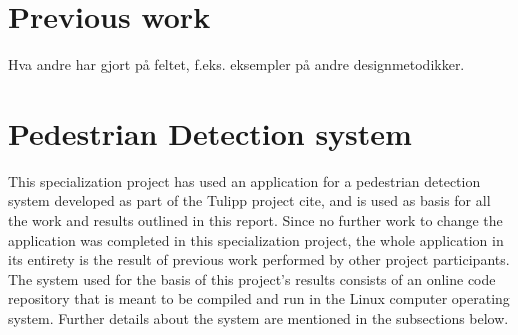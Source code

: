 \section{Previous work}
Hva andre har gjort på feltet, f.eks. eksempler på andre designmetodikker. 

\section{Pedestrian Detection system}
This specialization project has used an application for a pedestrian detection system developed as part of the Tulipp project cite, and is used as basis for all the work and results outlined in this report. Since no further work to change the application was completed in this specialization project, the whole application in its entirety is the result of previous work performed by other project participants. The system used for the basis of this project's results consists of an online code repository that is meant to be compiled and run in the Linux computer operating system. Further details about the system are mentioned in the subsections below. 
\\\\

